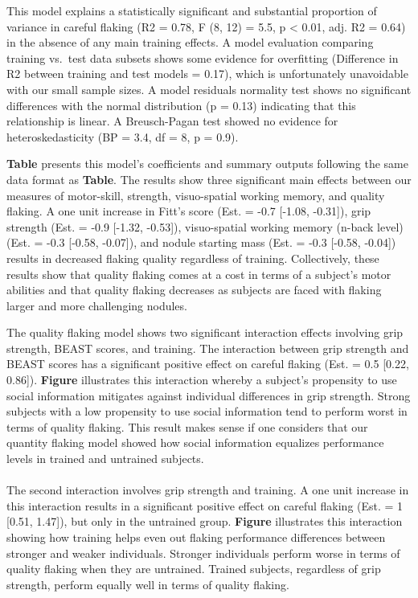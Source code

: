 \documentclass[smallextended]{svjour3}       %
\begin{document}
This model explains a statistically significant and substantial
proportion of variance in careful flaking (R2 = 0.78, F (8, 12) = 5.5, p
\textless{} 0.01, adj. R2 = 0.64) in the absence of any main training
effects. A model evaluation comparing training vs.~test data subsets
shows some evidence for overfitting (Difference in R2 between training
and test models = 0.17), which is unfortunately unavoidable with our
small sample sizes. A model residuals normality test shows no
significant differences with the normal distribution (p = 0.13)
indicating that this relationship is linear. A Breusch-Pagan test showed
no evidence for heteroskedasticity (BP = 3.4, df = 8, p = 0.9).

\hfill\break
\textbf{Table} presents this model's coefficients and summary outputs
following the same data format as \textbf{Table}. The results show three
significant main effects between our measures of motor-skill, strength,
visuo-spatial working memory, and quality flaking. A one unit increase
in Fitt's score (Est. = -0.7 {[}-1.08, -0.31{]}), grip strength (Est. =
-0.9 {[}-1.32, -0.53{]}), visuo-spatial working memory (n-back level)
(Est. = -0.3 {[}-0.58, -0.07{]}), and nodule starting mass (Est. = -0.3
{[}-0.58, -0.04{]}) results in decreased flaking quality regardless of
training. Collectively, these results show that quality flaking comes at
a cost in terms of a subject's motor abilities and that quality flaking
decreases as subjects are faced with flaking larger and more challenging
nodules.

The quality flaking model shows two significant interaction effects
involving grip strength, BEAST scores, and training. The interaction
between grip strength and BEAST scores has a significant positive effect
on careful flaking (Est. = 0.5 {[}0.22, 0.86{]}). \textbf{Figure}
illustrates this interaction whereby a subject's propensity to use
social information mitigates against individual differences in grip
strength. Strong subjects with a low propensity to use social
information tend to perform worst in terms of quality flaking. This
result makes sense if one considers that our quantity flaking model
showed how social information equalizes performance levels in trained
and untrained subjects.~\\
~\\
The second interaction involves grip strength and training. A one unit
increase in this interaction results in a significant positive effect on
careful flaking (Est. = 1 {[}0.51, 1.47{]}), but only in the untrained
group. \textbf{Figure} illustrates this interaction showing how training
helps even out flaking performance differences between stronger and
weaker individuals. Stronger individuals perform worse in terms of
quality flaking when they are untrained. Trained subjects, regardless of
grip strength, perform equally well in terms of quality flaking.
\end{document}
